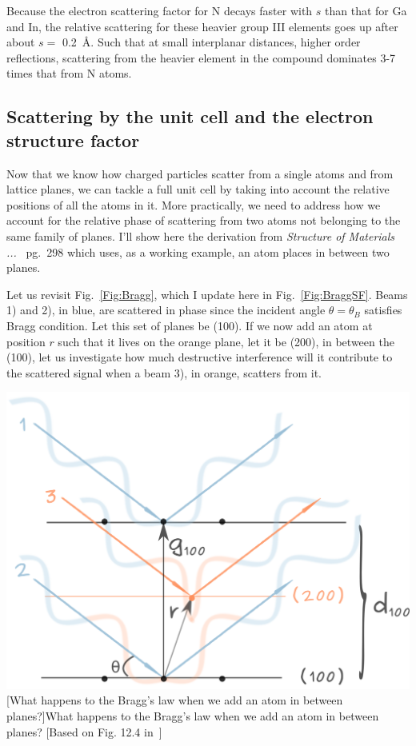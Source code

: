 Because the electron scattering factor for N decays faster with $s$ than that for Ga and In, the relative scattering for these heavier group III elements goes up after about $s=$ \SI{0.2}{\angstrom}. Such that at small interplanar distances, \eg higher order reflections, scattering from the heavier element in the compound dominates 3-7 times that from N atoms. 



%
\subsection{Scattering by the unit cell and the electron structure factor}
\label{sec:strucFact}

Now that we know how charged particles scatter from a single atoms and from lattice planes, we can tackle a full unit cell by taking into account the relative positions of all the atoms in it. More practically, we need to address how  we account for the relative phase of scattering from two atoms not belonging to the same family of planes. I'll show here the derivation from \textit{Structure of Materials ...}~\cite{SoM} pg.~298 which uses, as a working example, an atom places in between two planes. 


\noindent \begin{minipage}{0.43\textwidth}
Let us revisit Fig.~\ref{Fig:Bragg}, which I update here in Fig.~\ref{Fig:BraggSF}. Beams 1) and 2), in blue, are scattered in phase since the incident angle $\theta = \theta_B$ satisfies Bragg condition. Let this set of planes be \hkl(100). If we now add an atom at position $r$ such that it lives on the orange plane, let it be \hkl(200), in between the \hkl(100),  let us investigate how much destructive interference will it contribute to the scattered signal when a beam 3), in orange, scatters from it.
\end{minipage} %
\begin{minipage}{0.6\textwidth}
\centering
\includegraphics[width=0.87\linewidth]{Figures/BraggSF.png}
[What happens to the Bragg's law when we add an atom in between planes?]{What happens to the Bragg's law when we add an atom in between planes? [Based on Fig. 12.4 in~\cite{SoM}]}
\label{Fig:BraggSF}
\end{minipage}

